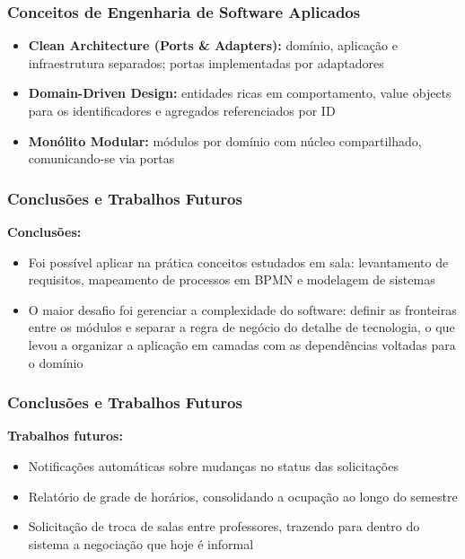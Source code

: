 \documentclass[11pt, xcolor={dvipsnames}, usepdftitle=false]{beamer}
\begin{document}
\begin{frame}
\frametitle{Conceitos de Engenharia de Software Aplicados}
\begin{itemize}
\item \textbf{Clean Architecture (Ports \& Adapters):} domínio, aplicação e infraestrutura separados; portas implementadas por adaptadores
\item \textbf{Domain-Driven Design:} entidades ricas em comportamento, value objects para os identificadores e agregados referenciados por ID
\item \textbf{Monólito Modular:} módulos por domínio com núcleo compartilhado, comunicando-se via portas
\end{itemize}
\end{frame}

\begin{frame}
\frametitle{Conclusões e Trabalhos Futuros}
\textbf{Conclusões:}
\begin{itemize}
\item Foi possível aplicar na prática conceitos estudados em sala: levantamento de requisitos, mapeamento de processos em BPMN e modelagem de sistemas
\item O maior desafio foi gerenciar a complexidade do software: definir as fronteiras entre os módulos e separar a regra de negócio do detalhe de tecnologia, o que levou a organizar a aplicação em camadas com as dependências voltadas para o domínio
\end{itemize}
\end{frame}

\begin{frame}
\frametitle{Conclusões e Trabalhos Futuros}
\textbf{Trabalhos futuros:}
\begin{itemize}
\item Notificações automáticas sobre mudanças no status das solicitações
\item Relatório de grade de horários, consolidando a ocupação ao longo do semestre
\item Solicitação de troca de salas entre professores, trazendo para dentro do sistema a negociação que hoje é informal
\end{itemize}
\end{frame}

\begin{frame}
\end{frame}

\lastslide
\end{document}
